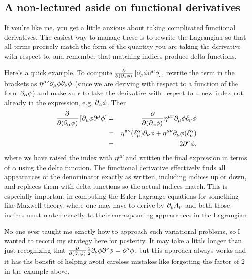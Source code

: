 \subsection*{A non-lectured aside on functional derivatives} If you're like me, you get a little anxious about taking complicated functional derivatives. The easiest way to manage these is to rewrite the Lagrangian so that all terms precisely match the form of the quantity you are taking the derivative with respect to, and remember that matching indices produce delta functions. 

Here's a quick example. To compute $\frac{\partial^{} }{\partial (\partial_\alpha \phi) ^{}}\left[ \partial_\mu \phi \partial^\mu \phi\right]$, rewrite the term in the brackets as $\eta^{\mu\nu}\partial_\mu \phi \partial_\nu \phi$ (since we are deriving with respect to a function of the form $\partial_\alpha \phi$) and make sure to take the derivative with respect to a new index not already in the expression, e.g. $\partial_\alpha \phi$. Then 
\begin{eqnarray*}
\frac{\partial^{} }{\partial (\partial_\alpha \phi) ^{}}\left[ \partial_\mu \phi \partial^\mu \phi\right]&=&\frac{\partial^{} }{\partial (\partial_\alpha \phi) ^{}}\eta^{\mu\nu}\partial_\mu \phi \partial_\nu \phi\\
&=& \eta^{\mu\nu} (\delta^\alpha_\mu)\partial_\nu \phi + \eta^{\mu\nu} \partial_\mu \phi (\delta _\nu^\alpha)\\
&=&2\partial^\alpha \phi,
\end{eqnarray*}
where we have raised the index with $\eta^{\mu\nu}$ and written the final expression in terms of $\alpha$ using the delta function. The functional derivative effectively finds all appearances of the denominator exactly as written, including indices up or down, and replaces them with delta functions so the actual indices match. This is especially important in computing the Euler-Lagrange equations for something like Maxwell theory, where one may have to derive by $\partial_\mu A_\nu$ and both those indices must match exactly to their corresponding appearances in the Lagrangian.

No one ever taught me exactly how to approach such variational problems, so I wanted to record my strategy here for posterity. It may take a little longer than just recognizing that $\frac{\partial^{} }{\partial (\partial_\mu \phi) ^{}} \frac{1}{2}\partial_\nu \phi \partial^\nu \phi = \partial^\mu \phi$, but this approach always works and it has the benefit of helping avoid careless mistakes like forgetting the factor of $2$ in the example above.